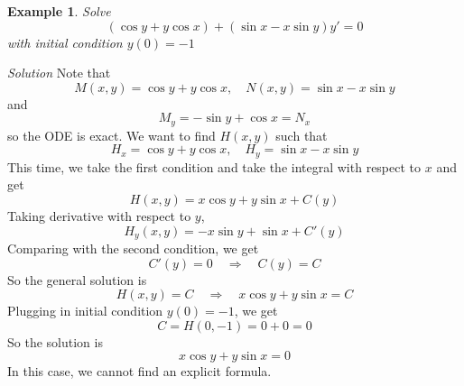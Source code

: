 \documentclass[10pt]{amsart}
\newtheorem{example}{Example}
\renewcommand{\ni}{\noindent}
\newcommand{\ti}{\textit}
\newcommand{\imply}{ \quad \Rightarrow \quad}
\newcommand{\bex}{\begin{example}}
\newcommand{\eex}{\end{example}}
\begin{document}
\bex Solve  
$$(\cos y + y \cos x) + (\sin x - x \sin y) y' = 0$$ 
with initial condition $y(0) = -1$
\eex

\ni\ti{Solution}  Note that
$$ M(x,y) =\cos y + y \cos x,\quad N(x,y) = \sin x - x \sin y $$
and
$$ M_{y} = -\sin y + \cos x = N_{x} $$
so the ODE is exact. We want to find $H(x,y)$ such that
$$ H_{x} = \cos y + y \cos x,\quad H_{y} = \sin x - x \sin y $$
This time, we take the first condition and take the integral with respect to $x$ and get
$$ H(x,y) = x\cos y + y\sin x + C(y) $$
Taking derivative with respect to $y$,
$$ H_{y}(x,y) = -x\sin y + \sin x + C'(y) $$
Comparing with the second condition, we get
$$ C'(y) = 0 \imply C(y) = C $$
So the general solution is
$$ H(x,y) = C \imply x\cos y + y\sin x = C $$
Plugging in initial condition $y(0)=-1$, we get
$$ C = H(0,-1) = 0 + 0 = 0 $$
So the solution is
$$  x\cos y + y\sin x = 0 $$
In this case, we cannot find an explicit formula.





 
\end{document}
